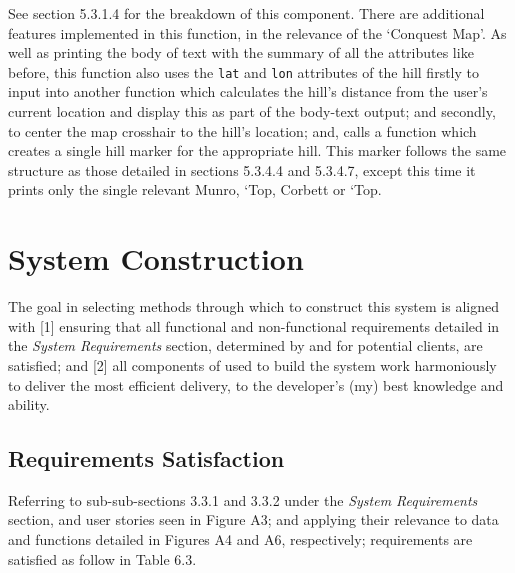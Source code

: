 \documentclass[11pt, english]{article}
\begin{document}
	See section 5.3.1.4 for the breakdown of this component. There are additional features implemented in this function, in the relevance of the `Conquest Map'. As well as printing the body of text with the summary of all the attributes like before, this function also uses the \texttt{lat} and \texttt{lon} attributes of the hill firstly to input into another function which calculates the hill's distance from the user's current location and display this as part of the body-text output; and secondly, to center the map crosshair to the hill's location; and, calls a function which creates a single hill marker for the appropriate hill. This marker follows the same structure as those detailed in sections 5.3.4.4 and 5.3.4.7, except this time it prints only the single relevant Munro, `Top, Corbett or `Top.

\newpage

\section{System Construction}\label{ch6}

	The goal in selecting methods through which to construct this system is aligned with [1] ensuring that all functional and non-functional requirements detailed in the \textit{System Requirements} section, determined by and for potential clients, are satisfied; and [2] all components of used to build the system work harmoniously to deliver the most efficient delivery, to the developer's (my) best knowledge and ability.

	\subsection{Requirements Satisfaction}

	Referring to sub-sub-sections 3.3.1 and 3.3.2 under the \textit{System Requirements} section, and user stories seen in Figure A3; and applying their relevance to data and functions detailed in Figures A4 and A6, respectively; requirements are satisfied as follow in Table 6.3.
\end{document}
